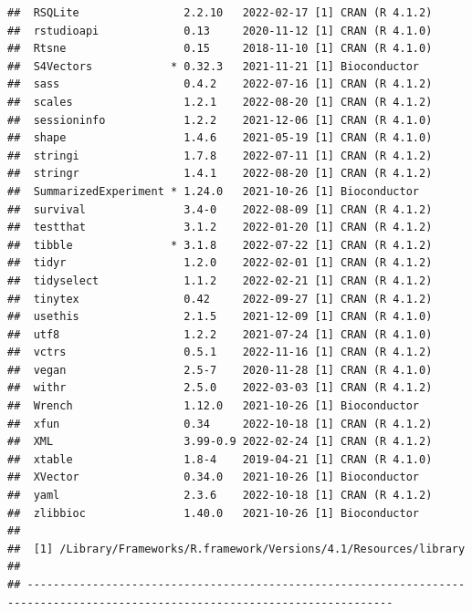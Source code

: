 \documentclass[
]{book}
\begin{document}
\begin{verbatim}
##  RSQLite                2.2.10   2022-02-17 [1] CRAN (R 4.1.2)
##  rstudioapi             0.13     2020-11-12 [1] CRAN (R 4.1.0)
##  Rtsne                  0.15     2018-11-10 [1] CRAN (R 4.1.0)
##  S4Vectors            * 0.32.3   2021-11-21 [1] Bioconductor
##  sass                   0.4.2    2022-07-16 [1] CRAN (R 4.1.2)
##  scales                 1.2.1    2022-08-20 [1] CRAN (R 4.1.2)
##  sessioninfo            1.2.2    2021-12-06 [1] CRAN (R 4.1.0)
##  shape                  1.4.6    2021-05-19 [1] CRAN (R 4.1.0)
##  stringi                1.7.8    2022-07-11 [1] CRAN (R 4.1.2)
##  stringr                1.4.1    2022-08-20 [1] CRAN (R 4.1.2)
##  SummarizedExperiment * 1.24.0   2021-10-26 [1] Bioconductor
##  survival               3.4-0    2022-08-09 [1] CRAN (R 4.1.2)
##  testthat               3.1.2    2022-01-20 [1] CRAN (R 4.1.2)
##  tibble               * 3.1.8    2022-07-22 [1] CRAN (R 4.1.2)
##  tidyr                  1.2.0    2022-02-01 [1] CRAN (R 4.1.2)
##  tidyselect             1.1.2    2022-02-21 [1] CRAN (R 4.1.2)
##  tinytex                0.42     2022-09-27 [1] CRAN (R 4.1.2)
##  usethis                2.1.5    2021-12-09 [1] CRAN (R 4.1.0)
##  utf8                   1.2.2    2021-07-24 [1] CRAN (R 4.1.0)
##  vctrs                  0.5.1    2022-11-16 [1] CRAN (R 4.1.2)
##  vegan                  2.5-7    2020-11-28 [1] CRAN (R 4.1.0)
##  withr                  2.5.0    2022-03-03 [1] CRAN (R 4.1.2)
##  Wrench                 1.12.0   2021-10-26 [1] Bioconductor
##  xfun                   0.34     2022-10-18 [1] CRAN (R 4.1.2)
##  XML                    3.99-0.9 2022-02-24 [1] CRAN (R 4.1.2)
##  xtable                 1.8-4    2019-04-21 [1] CRAN (R 4.1.0)
##  XVector                0.34.0   2021-10-26 [1] Bioconductor
##  yaml                   2.3.6    2022-10-18 [1] CRAN (R 4.1.2)
##  zlibbioc               1.40.0   2021-10-26 [1] Bioconductor
## 
##  [1] /Library/Frameworks/R.framework/Versions/4.1/Resources/library
## 
## ------------------------------------------------------------------------------------------------------------------------------
\end{verbatim}

  
\end{document}
